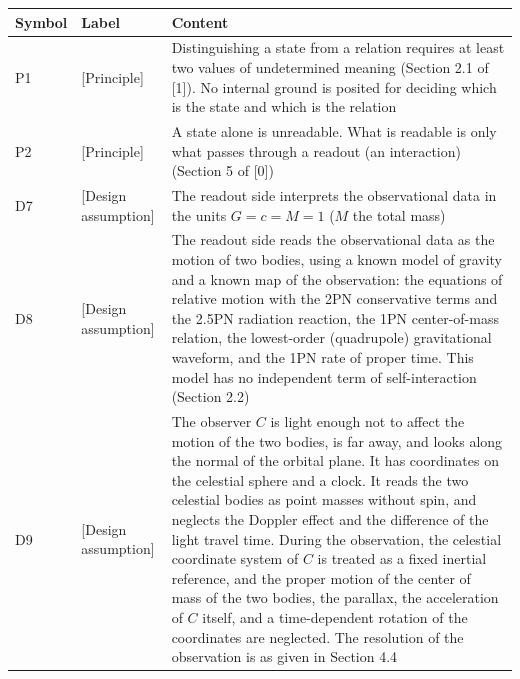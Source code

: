 \documentclass[
  a4paper,
]{article}
\newcounter{none} %
\begin{document}
{\def\LTcaptype{none} %
\begin{longtable}[]{@{}
  >{\raggedright\arraybackslash}p{}
  >{\raggedright\arraybackslash}p{}
  >{\raggedright\arraybackslash}p{}@{}}
\toprule\noalign{}
\begin{minipage}[b]{\linewidth}\raggedright
Symbol
\end{minipage} & \begin{minipage}[b]{\linewidth}\raggedright
Label
\end{minipage} & \begin{minipage}[b]{\linewidth}\raggedright
Content
\end{minipage} \\
\midrule\noalign{}
\endhead
\bottomrule\noalign{}
\endlastfoot
P1 & {[}Principle{]} & Distinguishing a state from a relation requires
at least two values of undetermined meaning (Section 2.1 of {[}1{]}). No
internal ground is posited for deciding which is the state and which is
the relation \\
P2 & {[}Principle{]} & A state alone is unreadable. What is readable is
only what passes through a readout (an interaction) (Section 5 of
{[}0{]}) \\
D7 & {[}Design assumption{]} & The readout side interprets the
observational data in the units \(G=c=M=1\) (\(M\) the total mass) \\
D8 & {[}Design assumption{]} & The readout side reads the observational
data as the motion of two bodies, using a known model of gravity and a
known map of the observation: the equations of relative motion with the
2PN conservative terms and the 2.5PN radiation reaction, the 1PN
center-of-mass relation, the lowest-order (quadrupole) gravitational
waveform, and the 1PN rate of proper time. This model has no independent
term of self-interaction (Section 2.2) \\
D9 & {[}Design assumption{]} & The observer \(C\) is light enough not to
affect the motion of the two bodies, is far away, and looks along the
normal of the orbital plane. It has coordinates on the celestial sphere
and a clock. It reads the two celestial bodies as point masses without
spin, and neglects the Doppler effect and the difference of the light
travel time. During the observation, the celestial coordinate system of
\(C\) is treated as a fixed inertial reference, and the proper motion of
the center of mass of the two bodies, the parallax, the acceleration of
\(C\) itself, and a time-dependent rotation of the coordinates are
neglected. The resolution of the observation is as given in Section
4.4 \\
\end{longtable}
}
\end{document}
